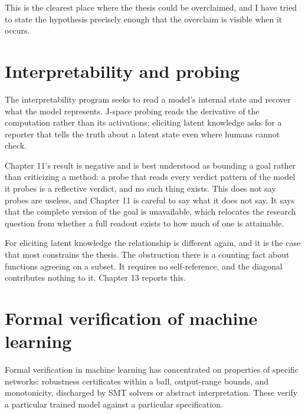 \documentclass{memoir}
\begin{document}
This is the clearest place where the thesis could be overclaimed, and I have
tried to state the hypothesis precisely enough that the overclaim is visible
when it occurs.



\section{Interpretability and probing}\label{Two--Schemas--of--Impossibility-005F-005F-005F--Machine--Checked--Limits--of--Trustworthy--Machine--Learning-005F-005F-005F--and--Why--They--Tighten--with--Capability----Related--Work--and--Positioning----Interpretability--and--probing}

The interpretability program seeks to read a model's internal state and recover
what the model represents. J-space probing reads the derivative of the
computation rather than its activations; eliciting latent knowledge asks for a
reporter that tells the truth about a latent state even where humans cannot
check.

Chapter 11's result is negative and is best understood as bounding a goal rather
than criticizing a method: a probe that reads every verdict pattern of the model
it probes is a reflective verdict, and no such thing exists. This does not say
probes are useless, and Chapter 11 is careful to say what it does not say. It
says that the complete version of the goal is unavailable, which relocates the
research question from whether a full readout exists to how much of one is
attainable.

For eliciting latent knowledge the relationship is different again, and it is
the case that most constrains the thesis. The obstruction there is a counting
fact about functions agreeing on a subset. It requires no self-reference, and
the diagonal contributes nothing to it. Chapter 13 reports this.



\section{Formal verification of machine learning}\label{Two--Schemas--of--Impossibility-005F-005F-005F--Machine--Checked--Limits--of--Trustworthy--Machine--Learning-005F-005F-005F--and--Why--They--Tighten--with--Capability----Related--Work--and--Positioning----Formal--verification--of--machine--learning}

Formal verification in machine learning has concentrated on properties of
specific networks: robustness certificates within a ball, output-range bounds,
and monotonicity, discharged by SMT solvers or abstract interpretation. These
verify a particular trained model against a particular specification.
\end{document}
